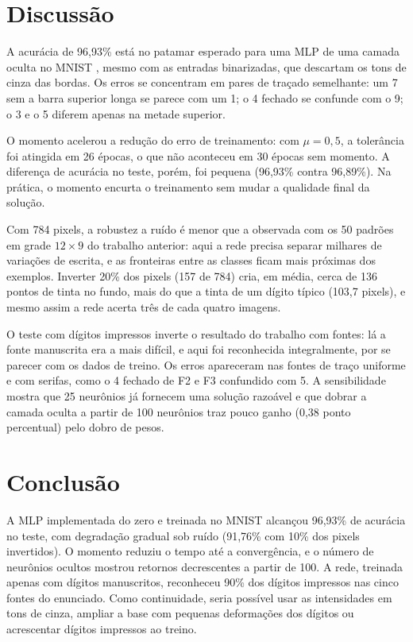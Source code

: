 \documentclass[12pt,a4paper]{article}
\begin{document}
\section{Discussão}

A acurácia de 96,93\% está no patamar esperado para uma MLP de uma camada oculta no MNIST
\cite{lecun1998}, mesmo com as entradas binarizadas, que descartam os tons de cinza das
bordas. Os erros se concentram em pares de traçado semelhante: um 7 sem a barra superior
longa se parece com um 1; o 4 fechado se confunde com o 9; o 3 e o 5 diferem apenas na
metade superior.

O momento acelerou a redução do erro de treinamento: com $\mu=0{,}5$, a tolerância foi
atingida em 26 épocas, o que não aconteceu em 30 épocas sem momento. A diferença de
acurácia no teste, porém, foi pequena (96,93\% contra 96,89\%). Na prática, o momento
encurta o treinamento sem mudar a qualidade final da solução.

Com 784 pixels, a robustez a ruído é menor que a observada com os 50 padrões em grade
$12\times9$ do trabalho anterior: aqui a rede precisa separar milhares de variações de
escrita, e as fronteiras entre as classes ficam mais próximas dos exemplos. Inverter 20\%
dos pixels (157 de 784) cria, em média, cerca de 136 pontos de tinta no fundo, mais do que
a tinta de um dígito típico (103,7 pixels), e mesmo assim a rede acerta três de cada quatro
imagens.

O teste com dígitos impressos inverte o resultado do trabalho com fontes: lá a fonte
manuscrita era a mais difícil, e aqui foi reconhecida integralmente, por se parecer com os
dados de treino. Os erros apareceram nas fontes de traço uniforme e com serifas, como o 4
fechado de F2 e F3 confundido com 5. A sensibilidade mostra que 25 neurônios já fornecem
uma solução razoável e que dobrar a camada oculta a partir de 100 neurônios traz pouco
ganho (0,38 ponto percentual) pelo dobro de pesos.

\section{Conclusão}

A MLP implementada do zero e treinada no MNIST alcançou 96,93\% de acurácia no teste, com
degradação gradual sob ruído (91,76\% com 10\% dos pixels invertidos). O momento reduziu o
tempo até a convergência, e o número de neurônios ocultos mostrou retornos decrescentes a
partir de 100. A rede, treinada apenas com dígitos manuscritos, reconheceu 90\% dos dígitos
impressos nas cinco fontes do enunciado. Como continuidade, seria possível usar as
intensidades em tons de cinza, ampliar a base com pequenas deformações dos dígitos ou
acrescentar dígitos impressos ao treino.
\end{document}
